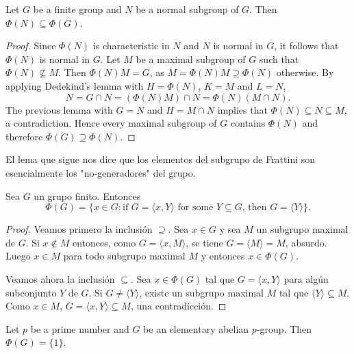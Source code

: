 \begin{proposition}
	\label{pro:phi(N)phi(G)}
	Let $G$ be a finite group and $N$ be a normal subgroup of $G$. Then $\Phi(N)\subseteq\Phi(G)$.
\end{proposition}

\begin{proof}
	Since $\Phi(N)$ is characteristic in $N$ and $N$ is normal in $G$, it follows that 
	$\Phi(N)$
	is normal in $G$.  Let $M$ be a maximal subgroup of $G$ such that 
	$\Phi(N)\not\subseteq M$.  Then $\Phi(N)M=G$, as 
	$M=\Phi(N)M\supseteq\Phi(N)$ otherwise. By applying Dedekind's lemma with 
	$H=\Phi(N)$, $K=M$ and $L=N$,   
	\[
		N=G\cap N=(\Phi(N)M)\cap N=\Phi(N)(M\cap N).
	\]
	The previous lemma with $G=N$ and $H=M\cap N$ implies that $\Phi(N)\subseteq
	N\subseteq M$, a contradiction. Hence every maximal subgroup of $G$ 
	contains $\Phi(N)$ and therefore $\Phi(G)\supseteq\Phi(N)$. 
\end{proof}

El lema que sigue nos dice que los elementos del subgrupo de Frattini son esencialmente
los "no-generadores" del grupo. 

\begin{lemma}
	\label{lemma:nongenerators}
	Sea $G$ un grupo finito. Entonces 
	\[
	\Phi(G)=\{x\in G:\text{if $G=\langle x,Y\rangle$ for some $Y\subseteq G$, then $G=\langle Y\rangle$}\}.
	\]
\end{lemma}

\begin{proof}
	Veamos primero la inclusión $\supseteq$.  Sea $x\in G$ y sea $M$ un
	subgrupo maximal de $G$.  Si $x\not\in M$ entonces, como $G=\langle
	x,M\rangle$, se tiene $G=\langle M\rangle=M$, absurdo. Luego $x\in M$ para
	todo subgrupo maximal $M$ y entonces $x\in \Phi(G)$. 

	Veamos ahora la inclusión $\subseteq$. Sea $x\in\Phi(G)$ tal que $G=\langle
	x,Y\rangle$ para algún subconjunto $Y$ de $G$. Si $G\ne \langle Y\rangle$,
	existe un subgrupo maximal $M$ tal que $\langle Y\rangle\subseteq M$. Como
	$x\in M$, $G=\langle x,Y\rangle\subseteq M$, una contradicción.
\end{proof}

\begin{exercise}
	Let $p$ be a prime number and $G$ be an elementary abelian $p$-group. Then 
	$\Phi(G)=\{1\}$.
\end{exercise}

